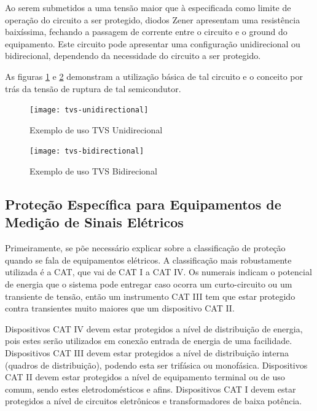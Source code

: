     Ao serem submetidos a uma tensão maior que à especificada como limite de operação do circuito a ser protegido, diodos Zener apresentam uma resistência baixíssima, fechando a passagem de corrente entre o circuito e o ground do equipamento. Este circuito pode apresentar uma configuração unidirecional ou bidirecional, dependendo da necessidade do circuito a ser protegido. 
    
    As figuras \ref{fig:tvsUnidirecional} e \ref{fig:tvsBidirecional} demonstram a utilização básica de tal circuito e o conceito por trás da tensão de ruptura de tal semicondutor.

    \begin{figure}[htb]%
        \caption{Exemplo de uso TVS Unidirecional}%
        \label{fig:tvsUnidirecional}%
        \texttt{[image: tvs-unidirectional]}%
    \end{figure}

    \begin{figure}[htb]%
        \caption{Exemplo de uso TVS Bidirecional}%
        \label{fig:tvsBidirecional}%
        \texttt{[image: tvs-bidirectional]}%
    \end{figure}

    \subsection{Proteção Específica para Equipamentos de Medição de Sinais Elétricos}\label{subsec:especProtec}

    Primeiramente, se põe necessário explicar sobre a classificação de proteção quando se fala de equipamentos elétricos. A classificação mais robustamente utilizada é a CAT, que vai de CAT I a CAT IV. Os numerais indicam o potencial de energia que o sistema pode entregar caso ocorra um curto-circuito ou um transiente de tensão, então um instrumento CAT III tem que estar protegido contra transientes muito maiores que um dispositivo CAT II.  

    Dispositivos CAT IV devem estar protegidos a nível de distribuição de energia, pois estes serão utilizados em conexão entrada de energia de uma facilidade. Dispositivos CAT III devem estar protegidos a nível de distribuição interna (quadros de distribuição), podendo esta ser trifásica ou monofásica. Dispositivos CAT II devem estar protegidos a nível de equipamento terminal ou de uso comum, sendo estes eletrodomésticos e afins. Dispositivos CAT I devem estar protegidos a nível de circuitos eletrônicos e transformadores de baixa potência. %


